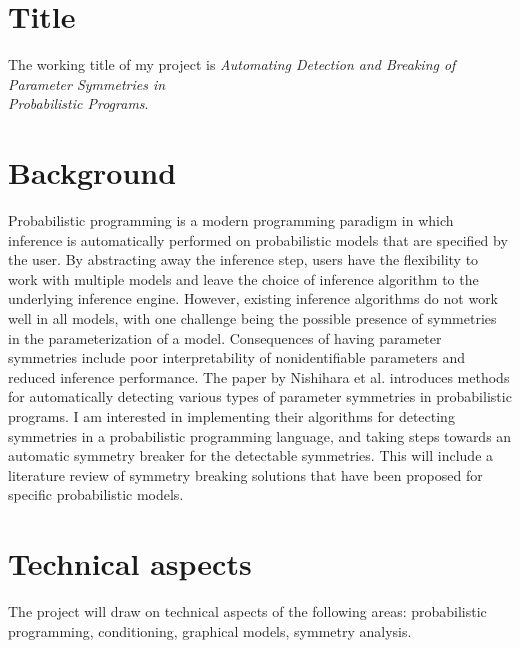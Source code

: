 \documentclass[]{STAT_547C}
\begin{document}
\vspace{-2cm}


\section{Title}

The working title of my project is \emph{Automating Detection and Breaking of Parameter Symmetries in\\Probabilistic Programs}.  



\section{Background}

Probabilistic programming is a modern programming paradigm in which inference is automatically performed on probabilistic models that are specified by the user. By abstracting away the inference step, users have the flexibility to work with multiple models and leave the choice of inference algorithm to the underlying inference engine. However, existing inference algorithms do not work well in all models, with one challenge being the possible presence of symmetries in the parameterization of a model. Consequences of having parameter symmetries include poor interpretability of nonidentifiable parameters and reduced inference performance. The paper by Nishihara et al. \cite{Nishihara:2013} introduces methods for automatically detecting various types of parameter symmetries in probabilistic programs. I am interested in implementing their algorithms for detecting symmetries in a probabilistic programming language, and taking steps towards an automatic symmetry breaker for the detectable symmetries. This will include a literature review of symmetry breaking solutions that have been proposed for specific probabilistic models.

\section{Technical aspects}

The project will draw on technical aspects of the following areas: probabilistic programming, conditioning, graphical models, symmetry analysis.
\end{document}
